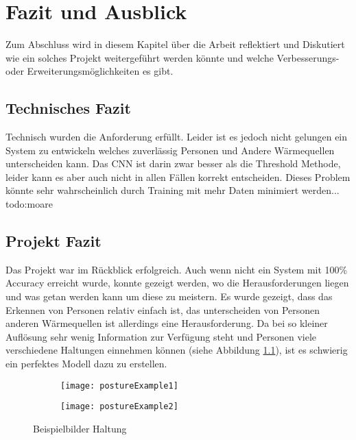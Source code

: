 \chapter{Fazit und Ausblick}
\label{ch:Ausblick}

Zum Abschluss wird in diesem Kapitel über die Arbeit reflektiert und Diskutiert wie ein solches Projekt weitergeführt werden könnte und welche Verbesserungs- oder Erweiterungsmöglichkeiten es gibt.

\section{Technisches Fazit}

Technisch wurden die Anforderung erfüllt. Leider ist es jedoch nicht gelungen ein System zu entwickeln welches zuverlässig Personen und Andere Wärmequellen unterscheiden kann. Das \gls{CNN} ist darin zwar besser als die Threshold Methode, leider kann es aber auch nicht in allen Fällen korrekt entscheiden. Dieses Problem könnte sehr wahrscheinlich durch Training mit mehr Daten minimiert werden... todo:moare

\section{Projekt Fazit}

Das Projekt war im Rückblick erfolgreich. Auch wenn nicht ein System mit 100\% Accuracy erreicht wurde, konnte gezeigt werden, wo die Herausforderungen liegen und was getan werden kann um diese zu meistern. Es wurde gezeigt, dass das Erkennen von Personen relativ einfach ist, das unterscheiden von Personen anderen Wärmequellen ist allerdings eine Herausforderung. Da bei so kleiner Auflösung sehr wenig Information zur Verfügung steht und Personen viele verschiedene Haltungen einnehmen können (siehe Abbildung \ref{fig:postureExample}), ist es schwierig ein perfektes Modell dazu zu erstellen.

\begin{figure}[H]
	\centering
	\begin{subfigure}{.4\linewidth}
		\centering
		\texttt{[image: postureExample1]}
	\end{subfigure}
	\begin{subfigure}{.4\linewidth}
		\centering
		\texttt{[image: postureExample2]}
	\end{subfigure}	
	\caption{Beispielbilder Haltung}
	\label{fig:postureExample}
\end{figure}

